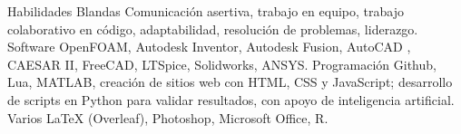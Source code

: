 

\begin{cvskills}
  \cvskill
    {Habilidades Blandas} %
    {Comunicación asertiva, trabajo en equipo, trabajo colaborativo en código, adaptabilidad, resolución de problemas, liderazgo.} %
  \cvskill
    {Software} %
    {OpenFOAM, Autodesk Inventor, Autodesk Fusion, AutoCAD , CAESAR II, FreeCAD, LTSpice, Solidworks, ANSYS.} %
  \cvskill
    {Programación} %
    {Github, Lua, MATLAB, creación de sitios web con HTML, CSS y JavaScript; desarrollo de scripts en Python para validar resultados, con apoyo de inteligencia artificial.} %
  \cvskill
    {Varios} %
    {LaTeX (Overleaf), Photoshop, Microsoft Office, R.} %

\end{cvskills}
